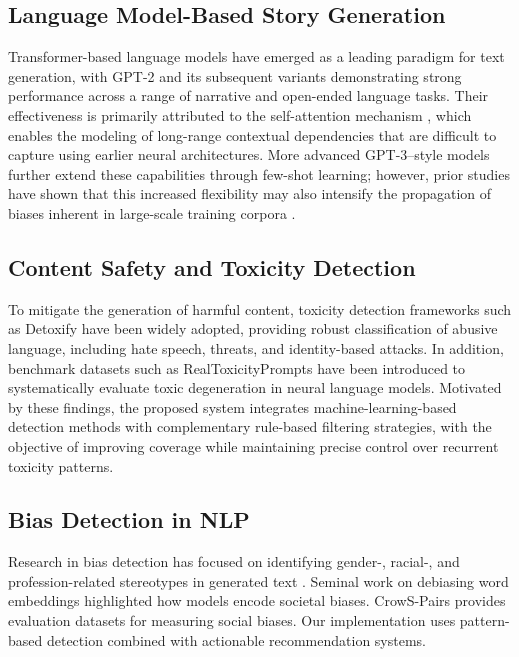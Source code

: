 \documentclass[conference]{IEEEtran}
\begin{document}
\subsection{Language Model-Based Story Generation}
Transformer-based language models have emerged as a leading paradigm for text generation, with GPT-2 \cite{radford2019language} and its subsequent variants demonstrating strong performance across a range of narrative and open-ended language tasks. Their effectiveness is primarily attributed to the self-attention mechanism \cite{vaswani2017attention}, which enables the modeling of long-range contextual dependencies that are difficult to capture using earlier neural architectures. More advanced GPT-3–style models \cite{brown2020language} further extend these capabilities through few-shot learning; however, prior studies have shown that this increased flexibility may also intensify the propagation of biases inherent in large-scale training corpora \cite{sheng2020towards}.

\subsection{Content Safety and Toxicity Detection}
To mitigate the generation of harmful content, toxicity detection frameworks such as Detoxify \cite{hanu2020detoxify} have been widely adopted, providing robust classification of abusive language, including hate speech, threats, and identity-based attacks. In addition, benchmark datasets such as RealToxicityPrompts \cite{gehman2020realtoxicityprompts} have been introduced to systematically evaluate toxic degeneration in neural language models. Motivated by these findings, the proposed system integrates machine-learning-based detection methods with complementary rule-based filtering strategies, with the objective of improving coverage while maintaining precise control over recurrent toxicity patterns.

\subsection{Bias Detection in NLP}
Research in bias detection has focused on identifying gender-, racial-, and profession-related stereotypes in generated text \cite{sheng2020towards}. Seminal work on debiasing word embeddings \cite{bolukbasi2016debiasing} highlighted how models encode societal biases. CrowS-Pairs \cite{nangia2020crows} provides evaluation datasets for measuring social biases. Our implementation uses pattern-based detection combined with actionable recommendation systems.
\end{document}
